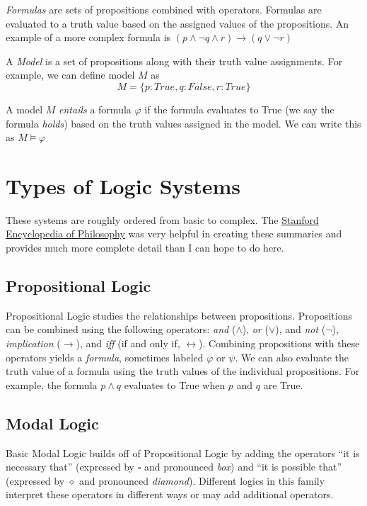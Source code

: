 \documentclass{article}
\begin{document}
\textit{Formulas} are sets of propositions combined with operators. Formulas are evaluated to a truth value based on the assigned values of the propositions. An example of a more complex formula is $(p \wedge \neg q \wedge r) \to (q \vee \neg r)$

A \textit{Model} is a set of propositions along with their truth value assignments. For example, we can define model $M$ as \[ M = \{p:True, q:False, r:True\}\]

A model $M$ \textit{entails} a formula $\varphi$ if the formula evaluates to True (we say the formula \textit{holds}) based on the truth values assigned in the model. We can write this as $M \models \varphi$


\section{Types of Logic Systems}
\label{sec:LogicSystems}

These systems are roughly ordered from basic to complex. The \href{https://plato.stanford.edu/}{Stanford Encyclopedia of Philosophy} was very helpful in creating these summaries and provides much more complete detail than I can hope to do here.

\subsection{Propositional Logic}
\label{sec:PropositionalLogic}
Propositional Logic studies the relationships between propositions.  Propositions can be combined using the following operators: \textit{and} ($\wedge$), \textit{or} ($\vee$), and \textit{not} ($\neg$), \textit{implication} ($\to$), and \textit{iff} (if and only if, $\leftrightarrow$). Combining propositions with these operators yields a \textit{formula}, sometimes labeled $\varphi$ or $\psi$. We can also evaluate the truth value of a formula using the truth values of the individual propositions. For example, the formula $p \wedge q$ evaluates to True when $p$ and $q$ are True.

\subsection{Modal Logic}
Basic Modal Logic builds off of Propositional Logic by adding the operators ``it is necessary that'' (expressed by $\square$ and pronounced \textit{box}) and ``it is possible that'' (expressed by $\diamond$ and pronounced \textit{diamond}). Different logics in this family interpret these operators in different ways or may add additional operators.
\end{document}

